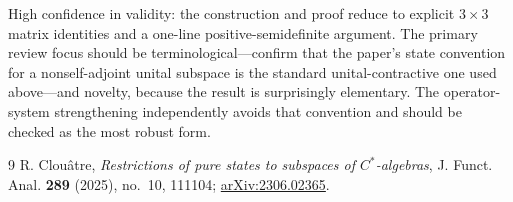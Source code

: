 \documentclass[11pt]{article}
\begin{document}
High confidence in validity: the construction and proof reduce to explicit
\(3\times3\) matrix identities and a one-line positive-semidefinite argument.
The primary review focus should be terminological---confirm that the paper's
state convention for a nonself-adjoint unital subspace is the standard
unital-contractive one used above---and novelty, because the result is
surprisingly elementary.  The operator-system strengthening independently
avoids that convention and should be checked as the most robust form.

\begin{thebibliography}{9}
R. Clou\^atre,
\emph{Restrictions of pure states to subspaces of \(C^*\)-algebras},
J. Funct. Anal. \textbf{289} (2025), no.~10, 111104;
\href{https://arxiv.org/abs/2306.02365}{arXiv:2306.02365}.
\end{thebibliography}
\end{document}
